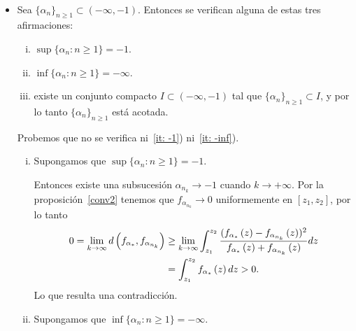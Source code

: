 \begin{dem} \ 
	\begin{itemize}
		\item Sea $\{\alpha_{n}\}_{n \ge 1} \subset (-\infty,-1)$. Entonces se verifican alguna de estas tres afirmaciones:
		
		\begin{enumerate}[(i)]
			\item\label{it: -1} $\sup\{\alpha_{n}: n \ge 1\} = -1$.
			\item\label{it: -inf} $\inf\{\alpha_{n}: n \ge 1\} = -\infty$.
			\item\label{it: acotada}  existe un conjunto compacto $I \subset (-\infty,-1)$ tal que $\{\alpha_{n}\}_{n \ge 1} \subset I$, y por lo tanto $\{\alpha_{n}\}_{n \ge 1}$ está acotada.
		\end{enumerate}
		
		Probemos que no se verifica ni~\ref{it: -1}) ni~\ref{it: -inf}).
		\begin{enumerate}[(i)]
			\item Supongamos que  $\sup\{\alpha_{n}: n \ge 1\} = -1$. 
			
			Entonces existe una subsucesión $\alpha_{n_{k}} \to -1$ cuando $k \to +\infty$. Por la proposición~\ref{conv2} tenemos que $f_{\alpha_{n_{k}}} \to 0$ uniformemente
			en $[z_{1},z_{2}]$, por lo tanto
			\begin{align*}
			0=\lim_{k\to\infty} d\left( f_{\alpha_{*}}, f_{\alpha_{n_{k}}} \right) 
			& \ge \lim_{k\to\infty}  \int_{z_{1}}^{z_{2}}\frac{(f_{\alpha_{*}}\left( z \right)-f_{\alpha_{n_{k}}}\left( z \right))^{2}}
			{f_{\alpha_{*}}\left( z \right)+f_{\alpha_{n_{k}}}\left( z \right)}dz \\
			& = \int_{z_{1}}^{z_{2}}f_{\alpha_{*}}\left( z \right)dz >0.
			\end{align*}
			Lo que resulta una contradicción.
			
			\item Supongamos que $\inf\{\alpha_{n}: n \ge 1\} = -\infty$.
			

\end{enumerate}
\end{itemize}
\end{dem}
